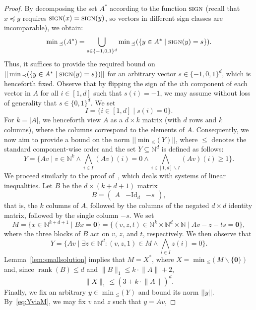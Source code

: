 \documentclass[11pt,a4paper]{amsart}
\newcommand{\sleq}{\preceq}
\newcommand{\minsleq}[1]{\min{}_\sleq(#1)}
\newcommand{\sign}{\textsc{sign}}
\newcommand{\nnorm}[1]{||#1||}
\newcommand{\Nat}{\mathbb{N}}
\newcommand{\setN}{\Nat}
\newcommand{\norm}[2]{\lVert #2 \rVert_{#1}}
\newcommand{\rank}[1]{\operatorname{rank}(#1)}
\let\origtextsc\textsc
\renewcommand{\textsc}[1]{\textnormal{\origtextsc{#1}}}
\theoremstyle{plain}
\theoremstyle{definition}
\theoremstyle{defC}
\theoremstyle{thmC}
\begin{document}
\begin{proof}
By decomposing the set $A^*$ according to the function $\sign$
 (recall that $x\sleq y$ requires $\sign(x)=\sign(y)$, so vectors in
 different sign classes are incomparable), we obtain:
		\[\minsleq{A^*}=\bigcup_{s\in \{-1,0,1\}^d}\minsleq{\{y\in A^*
	\mid \sign(y)=s\}}.\]
	Thus, it suffices to provide the required bound on
	$\nnorm{\minsleq{\{y\in A^* \mid \sign(y)=s\}}}$ 
	for an arbitrary vector  $s\in\{-1,0,1\}^d$, which is henceforth fixed.
Observe that by flipping the sign of the $i$th component of each
	vector in $A$ for all $i\in[1,d]$ such that $s(i)=-1$, we may
	assume without loss of generality that $s\in \{0,1\}^d$. We
	set  \[I=\{i\in[1,d]\mid s(i)=0\}.\]
	For $k=|A|$, we henceforth view $A$ as a $d\times k$ matrix
	(with $d$ rows and $k$ columns), where
the columns correspond to the elements of $A$.
	Consequently, we now aim to provide a bound on the
	norm $\nnorm{\min{}_{\leq}(Y)}$, where $\leq$
	denotes the
	standard component-wise order and the set $Y\subseteq \setN^d$
	is defined as follows:
	\[Y=\{Av \mid v\in\setN^k
	\land \bigwedge_{i\in I}(Av)(i)=0\land
	\bigwedge_{i\in[1,d]\smallsetminus I}(Av)(i)\geq 1\}.\]
We proceed similarly to the proof
	of~\cite[Corollary~1]{DBLP:conf/rta/Pottier91}, which deals with
systems of linear inequalities.
Let $B$ be the $d \times (k+d+1)$ matrix
\[B=\left(\begin{array}{c|c|c} A & -\mathrm{Id}_d & -s\end{array}\right),\]
that is, the $k$ columns of $A$, followed by the columns of the negated
$d\times d$ identity matrix, followed by the single column $-s$.
We set 
	\[M=\{x\in\setN^{k+d+1}\mid
	Bx=\mathbf{0}\}=\{(v,z,t)\in\setN^k\times\setN^d\times\setN\mid
	Av-z-ts=\mathbf{0}\},\]
where the three blocks of $B$ act on $v$, $z$, and $t$, respectively.
	We then observe that 
	\begin{equation}\label{eq:YviaM}
		Y=\{Av\mid \exists z\in\setN^d: (v,z,1)\in M\land
	\bigwedge_{i\in I}z(i)=0\}.
	\end{equation}
 Lemma~\ref{lem:smallsolution} implies that $M=X^*$, 
		where $X=\min{}_{\leq}(M\smallsetminus\{\mathbf{0}\})$ and,
		since $\rank{B}\leq d$ and $\norm{1}{B}\leq
		k\cdot\norm{}{A}+2$,
	\begin{equation}\label{eq:XboundforM}
		\norm{1}{X}\leq (3+k\cdot\norm{}{A})^d.
	\end{equation}
Finally, we fix an arbitrary  $y\in \min{}_{\leq}(Y)$ and bound its
	norm $\nnorm{y}$.
	By~\eqref{eq:YviaM}, we may fix $v$ and $z$ such that $y=Av$,

\end{proof}
\end{document}
